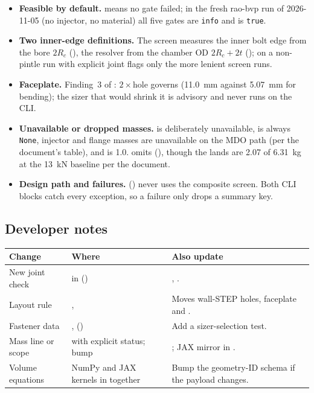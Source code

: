 \begin{itemize}
\item \textbf{Feasible by default.}  means no gate failed; in the fresh rao-bvp run of 2026-11-05 (no injector, no material) all five gates are \texttt{info} and  is \texttt{true}.
\item \textbf{Two inner-edge definitions.} The screen measures the inner bolt edge from the bore $2R_c$ (), the resolver from the chamber OD $2R_c+2t$ (); on a non-pintle run with explicit joint flags only the more lenient screen runs.
\item \textbf{Faceplate.} Finding~3 of : $2\times$hole governs (11.0~mm against 5.07~mm for bending); the sizer that would shrink it is advisory and never runs on the CLI.
\item \textbf{Unavailable or dropped masses.}  is deliberately unavailable,  is always \texttt{None}, injector and flange masses are unavailable on the MDO path (per the document's table), and  is 1.0.  omits  (), though the lands are 2.07 of 6.31~kg at the 13~kN baseline per the document.
\item \textbf{Design path and failures.}  () never uses the composite screen. Both CLI blocks catch every exception, so a failure only drops a summary key.
\end{itemize}

\subsection{Developer notes}

\begingroup\footnotesize
\begin{longtable}{@{}P{3.0cm}P{6.4cm}P{6.6cm}@{}}
\toprule
\textbf{Change} & \textbf{Where} & \textbf{Also update} \\
\midrule
\endhead
New joint check &  in  () & , . \\
Layout rule & ,  & Moves wall-STEP holes, faceplate and . \\
Fastener data & ,  () & Add a sizer-selection test. \\
Mass line or scope &  with explicit status; bump  & ; JAX mirror in . \\
Volume equations & NumPy and JAX kernels in  together & Bump the geometry-ID schema if the payload changes. \\
\bottomrule
\end{longtable}
\endgroup

